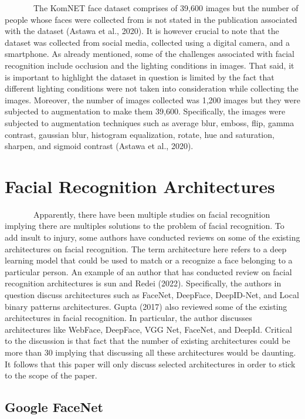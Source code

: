 \documentclass[
  12pt,
]{report}
\begin{document}
~~~~~~~The KomNET face dataset comprises of 39,600 images but the number
of people whose faces were collected from is not stated in the
publication associated with the dataset (Astawa et al., 2020). It is
however crucial to note that the dataset was collected from social
media, collected using a digital camera, and a smartphone. As already
mentioned, some of the challenges associated with facial recognition
include occlusion and the lighting conditions in images. That said, it
is important to highlight the dataset in question is limited by the fact
that different lighting conditions were not taken into consideration
while collecting the images. Moreover, the number of images collected
was 1,200 images but they were subjected to augmentation to make them
39,600. Specifically, the images were subjected to augmentation
techniques such as average blur, emboss, flip, gamma contrast, gaussian
blur, histogram equalization, rotate, hue and saturation, sharpen, and
sigmoid contrast (Astawa et al., 2020).

\section{Facial Recognition
Architectures}\label{facial-recognition-architectures}

~~~~~~~Apparently, there have been multiple studies on facial
recognition implying there are multiples solutions to the problem of
facial recognition. To add insult to injury, some authors have conducted
reviews on some of the existing architectures on facial recognition. The
term architecture here refers to a deep learning model that could be
used to match or a recognize a face belonging to a particular person. An
example of an author that has conducted review on facial recognition
architectures is sun and Redei (2022). Specifically, the authors in
question discuss architectures such as FaceNet, DeepFace, DeepID-Net,
and Local binary patterns architectures. Gupta (2017) also reviewed some
of the existing architectures in facial recognition. In particular, the
author discusses architectures like WebFace, DeepFace, VGG Net, FaceNet,
and DeepId. Critical to the discussion is that fact that the number of
existing architectures could be more than 30 implying that discussing
all these architectures would be daunting. It follows that this paper
will only discuss selected architectures in order to stick to the scope
of the paper.

\subsection{Google FaceNet}\label{google-facenet}
\end{document}
